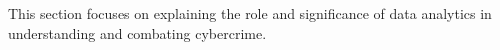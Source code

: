This section focuses on explaining the role and significance of data analytics in understanding and combating cybercrime.